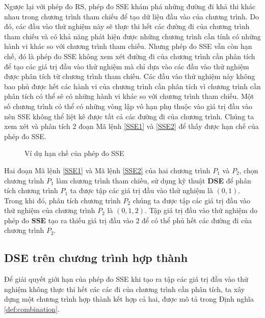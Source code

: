 Ngược lại với phép đo RS, phép đo SSE khám phá những đường đi khả thi
khác nhau trong chương trình tham chiếu để tạo dữ liệu đầu vào của
chương trình. Do đó, các đầu vào thử nghiệm này sẽ thực thi hết các
đường đi của chương trình tham chiếu và có khả năng phát hiện được
những chương trình cần tính có những hành vi khác so với chương trình
tham chiếu. Nhưng phép đo SSE vẫn còn hạn chế, đó là phép đo SSE không
xem xét đường đi của chương trình cần phân tích để tạo các giá trị đầu
vào thử nghiệm mà chỉ dựa vào các đầu vào thử nghiệm được phân tích từ
chương trình tham chiếu. Các đầu vào thử nghiệm này không bao phủ được
hết các hành vi của chương trình cần phân tích vì chương trình cần
phân tích có thể sẽ có những hành vi khác so với chương trình tham
chiếu. Một số chương trình có thể có những vòng lập vô hạn phụ thuộc
vào giá trị đầu vào nên SSE không thể liệt kê được tất cả các đường
đi của chương trình. Chúng ta xem xét và phân tích 2 đoạn Mã lệnh
\ref{SSE1} và \ref{SSE2} để thấy được hạn chế của phép đo SSE.
\begin{figure}[h]
	\centering
	\caption{Ví dụ hạn chế của phép đo SSE}
	\label{fig:hanche-SSE}
\begin{minipage}[t]{0.45\linewidth}
  
\end{minipage}%
\hfill\vrule\hfill
\begin{minipage}[t]{0.45\linewidth}
	
\end{minipage}%
\end{figure}

Hai đoạn Mã lệnh \ref{SSE1} và Mã lệnh \ref{SSE2} của hai chương trình
$P_{1}$ và $P_{2}$, chọn chương trình $P_{1}$ làm chương trình tham
chiếu, sử dụng kỹ thuật \textbf{DSE} để phân tích chương trình $P_{1}$
ta được tập các giá trị đầu vào thử nghiệm là ${(0, 1)}$. Trong khi
đó, phân tích chương trình $P_{2}$ chúng ta được tập các giá trị đầu
vào thử nghiệm của chương trình $P_{2}$ là ${(0, 1, 2)}$. Tập giá trị đầu vào thử nghiệm do phép đo \textbf{SSE} tạo ra thiếu giá trị đầu vào $2$ để có thể phủ hết các đường đi của chương trình $P_{2}$.

\subsection{DSE trên chương trình hợp thành}

Để giải quyết giới hạn của phép đo SSE khi tạo ra tập các giá trị đầu
vào thử nghiệm không thực thi hết các các đi của chương trình cần phân
tích, ta xây dựng một chương trình hợp thành kết hợp cả hai, được mô
tả trong Định nghĩa \ref{def:combination}.


